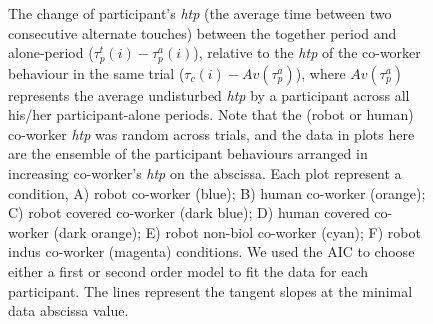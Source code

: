 \begin{figure}[hbpt]
	\caption{The change of participant's {\it htp} (the average time between two consecutive alternate touches) between the together period and alone-period ($\tau_p^t(i)-\tau_p^a(i)$), relative to the {\it htp} of the co-worker behaviour in the same trial ($\tau_c (i)-Av(\tau_p^a)$), where $Av(\tau_p^a)$ represents the average undisturbed {\it htp} by a participant across all his/her participant-alone periods. Note that the (robot or human) co-worker {\it htp} was random across trials, and the data in plots here are the ensemble of the participant behaviours arranged in increasing co-worker's {\it htp} on the abscissa. Each plot represent a condition, A) robot co-worker (blue); B) human co-worker (orange); C) robot covered co-worker (dark blue); D) human covered co-worker (dark orange); E) robot non-biol co-worker (cyan); F) robot indus co-worker (magenta) conditions. We used the AIC to choose either a first or second order model to fit the data for each participant. The lines represent the tangent slopes at the minimal data abscissa value.}
	\label{fig:allfit}
\end{figure}

